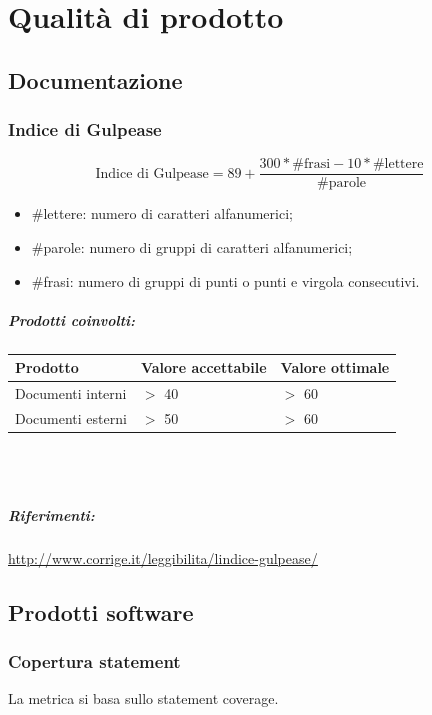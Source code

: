 \documentclass[a4paper, 12pt]{article}
\begin{document}
\makefrontpage
\makeindexdetails
\makeversioni
\tableofcontents
\clearpage
\makecontentsdetails

\section{Qualità di prodotto}

\subsection{Documentazione}
\subsubsection{Indice di Gulpease}
\[ \text{Indice di Gulpease} = 89 + \frac{300*\text{\#frasi} - 10*\text{\#lettere}}{\text{\#parole}} \]
\begin{itemize}
	\item \#lettere: numero di caratteri alfanumerici;
	\item \#parole: numero di gruppi di caratteri alfanumerici;
	\item \#frasi: numero di gruppi di punti o punti e virgola consecutivi.
\end{itemize}

\subparagraph{Prodotti coinvolti:}
\begin{center}
	\begin{tabularx}{\textwidth}{|X|X|X|}
		\hline
		\textbf{Prodotto} & \textbf{Valore accettabile} & \textbf{Valore ottimale } \\
		\hline
		Documenti interni & $>$ 40                      & $>$ 60                    \\
		\hline
		Documenti esterni & $>$ 50                      & $>$ 60                    \\
		\hline
	\end{tabularx}\\[8pt]
	\mbox{}\\
\end{center}

\subparagraph{Riferimenti:} \underline{\href{http://www.corrige.it/leggibilita/lindice-gulpease/}{http://www.corrige.it/leggibilita/lindice-gulpease/}}

\subsection{Prodotti software}

\subsubsection{Copertura statement}
La metrica si basa sullo statement coverage.
\end{document}
